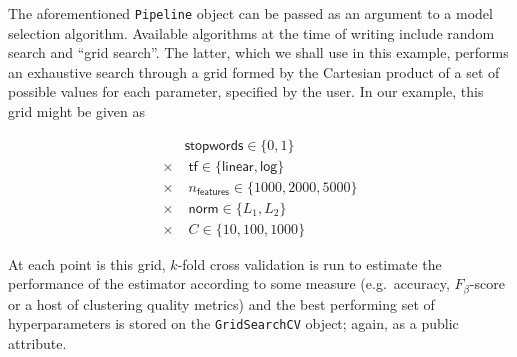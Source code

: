 The aforementioned \texttt{Pipeline} object
can be passed as an argument to a model selection algorithm.
Available algorithms at the time of writing include random search
\citep{bergstra2012} and ``grid search''.
The latter, which we shall use in this example,
performs an exhaustive search through a grid formed by the Cartesian product
of a set of possible values for each parameter, specified by the user.
In our example, this grid might be given as

\begin{align*}
         & \textsf{stopwords} \in \{0, 1\}                      \\
  \times & \; \textsf{tf} \in \{\textsf{linear}, \textsf{log}\} \\
  \times & \; n_\textsf{features} \in \{1000, 2000, 5000\}      \\
  \times & \; \textsf{norm} \in \{L_1, L_2\}                    \\
  \times & \; C \in \{10, 100, 1000\}
\end{align*}

At each point is this grid, $k$-fold cross validation is run
to estimate the performance of the estimator according to some measure
(e.g.\ accuracy, $F_\beta$-score or a host of clustering quality metrics)
and the best performing set of hyperparameters is stored
on the \texttt{GridSearchCV} object; again, as a public attribute.
